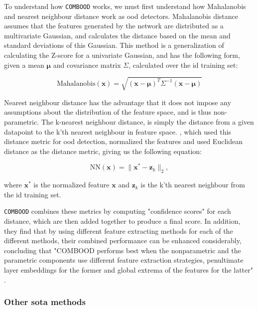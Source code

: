 \documentclass[UKenglish]{uiomasterthesis} %
\theoremstyle{definition}
\begin{document}
To understand how \texttt{COMBOOD} works, we must first understand how Mahalanobis and nearest neighbour distance work as \ac{ood} detectors. Mahalanobis distance assumes that the features generated by the network are distributed as a multivariate Gaussian, and calculates the distance based on the mean and standard deviations of this Gaussian. This method is a generalization of calculating the Z-score for a univariate Gaussian, and has the following form, given a mean $\bm{\mu}$ and covariance matrix $\Sigma$, calculated over the \ac{id} training set:

\begin{equation}
    \text{Mahalanobis}(\bm{x}) = \sqrt{(\bm{x} - \bm{\mu})^T\Sigma^{-1}(\bm{x} - \bm{\mu})}
\end{equation}

Nearest neighbour distance has the advantage that it does not impose any assumptions about the distribution of the feature space, and is thus non-parametric. The k-nearest neighbour distance, is simply the distance from a given datapoint to the k'th nearest neighbour in feature space. \cite{nearestneighbour}, which used this distance metric for \ac{ood} detection, normalized the features and used Euclidean distance as the distance metric, giving us the following equation:

\begin{equation}
    \text{NN}(\bm{x}) = \| \bm{x^*} - \bm{z}_k \|_2,
\end{equation}

where $\bm{x^*}$ is the normalized feature $\bm{x}$ and $\bm{z}_k$ is the k'th nearest neighbour from the \ac{id} training set.

\texttt{COMBOOD} combines these metrics by computing "confidence scores" for each distance, which are then added together to produce a final score. In addition, they find that by using different feature extracting methods for each of the different methods, their combined performance can be enhanced considerably, concluding that "COMBOOD performs best when the nonparametric and the parametric components use different feature extraction strategies, penultimate layer embeddings for the former and global extrema of the features for the latter" \cite{combood}.

\subsubsection{Other \acl{sota} methods}
\end{document}
